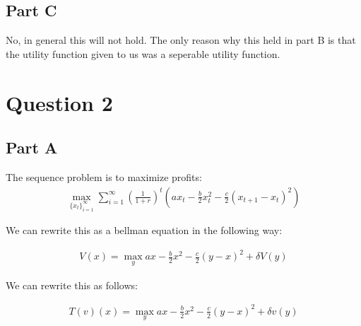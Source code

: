 \documentclass[11pt]{article} %
\begin{document}

\subsection{Part C}

No, in general this will not hold. The only reason why this held in part B is that the utility function given to us was a seperable utility function. 

\section{Question 2}
\subsection{Part A}
The sequence problem is to maximize profits:
\begin{align*}
\max_{\{ x_t\}_{i=1}^{\infty}} \sum_{i=1}^{\infty}\left( \frac{1}{1+r} \right)^{t}\left( ax_t - \frac{b}{2}x_t^2 - \frac{c}{2}(x_{t+1}-x_t)^2\right)
\end{align*}

We can rewrite this as a bellman equation in the following way:

\begin{align}
V(x) =\max_{y} ax - \frac{b}{2}x^2 - \frac{c}{2}(y-x)^2 + \delta V(y) \label{eqn:bell}
\end{align}

We can rewrite this as follows:

\begin{align}
T(v)(x) =\max_{y} ax - \frac{b}{2}x^2 - \frac{c}{2}(y-x)^2 + \delta v(y) \label{eqn:bellT}
\end{align}
\end{document}

